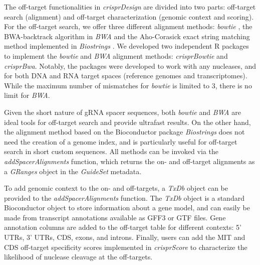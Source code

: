 \documentclass[pdftex,english,10pt]{article}
\begin{document}
The off-target functionalities in \textit{crisprDesign} are divided into two parts: off-target search (alignment) and off-target characterization (genomic context and scoring). For the off-target search, we offer three different alignment methods: \textit{bowtie} \citep{bowtie}, the BWA-backtrack algorithm in \textit{BWA} \citep{bwa} and the Aho-Corasick exact string matching method implemented in \textit{Biostrings} \citep{aho1975efficient,pages2016biostrings}. 
We developed two independent R packages to implement the \textit{bowtie} and \textit{BWA} alignment methods: \textit{crisprBowtie} and \textit{crisprBwa}. 
Notably, the packages were developed to work with any nucleases, and for both DNA and RNA target spaces (reference genomes and transcriptomes). 
While the maximum number of mismatches for \textit{bowtie} is limited to 3, there is no limit for \textit{BWA}. 

Given the short nature of gRNA spacer sequences, both \textit{bowtie} and \textit{BWA} are ideal tools for off-target search and provide ultrafast results.
On the other hand, the alignment method based on the Bioconductor package \textit{Biostrings} does not need the creation of a genome index, and is particularly useful for off-target search in short custom sequences. All methods can be invoked via the \textit{addSpacerAlignments} function, which returns the on- and off-target alignments as a \textit{GRanges} object in the \textit{GuideSet} metadata.


To add genomic context to the on- and off-targets, a \textit{TxDb} object can be provided to the \textit{addSpacerAlignments} function. 
The \textit{TxDb} object is a standard Bioconductor object to store information about a gene model, and can easily be made from transcript annotations available as GFF3 or GTF files. Gene annotation columns are added to the off-target table for different contexts: 5' UTRs, 3' UTRs, CDS, exons, and introns. Finally, users can add the MIT and CDS off-target specificity scores \citep{mit, azimuth} implemented in \textit{crisprScore} to characterize the likelihood of nuclease cleavage at the off-targets. 
\end{document}
